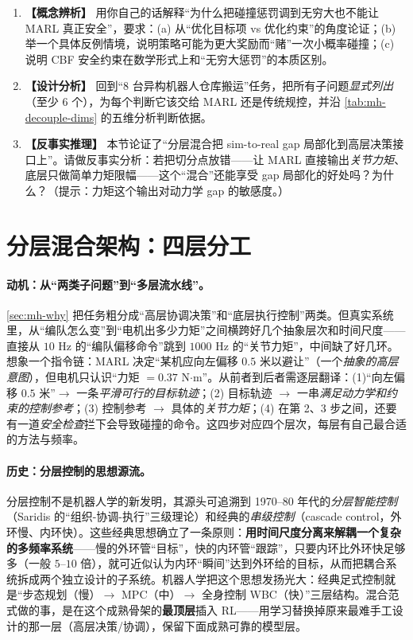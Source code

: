 \begin{practice}
\begin{enumerate}
  \item \textbf{【概念辨析】} 用你自己的话解释“为什么把碰撞惩罚调到无穷大也不能让 MARL 真正安全”，要求：(a) 从“优化目标项 vs 优化约束”的角度论证；(b) 举一个具体反例情境，说明策略可能为更大奖励而“赌”一次小概率碰撞；(c) 说明 CBF 安全约束在数学形式上和“无穷大惩罚”的本质区别。
  \item \textbf{【设计分析】} 回到“$8$ 台异构机器人仓库搬运”任务，把所有子问题\emph{显式列出}（至少 $6$ 个），为每个判断它该交给 MARL 还是传统规控，并沿 \cref{tab:mh-decouple-dims} 的五维分析判断依据。
  \item \textbf{【反事实推理】} 本节论证了“分层混合把 sim-to-real gap 局部化到高层决策接口上”。请做反事实分析：若把切分点放错——让 MARL 直接输出\emph{关节力矩}、底层只做简单力矩限幅——这个“混合”还能享受 gap 局部化的好处吗？为什么？（提示：力矩这个输出对动力学 gap 的敏感度。）
\end{enumerate}
\end{practice}

\section{分层混合架构：四层分工}
\label{sec:mh-hierarchy}

\paragraph{动机：从“两类子问题”到“多层流水线”。}
\cref{sec:mh-why} 把任务粗分成“高层协调决策”和“底层执行控制”两类。但真实系统里，从“编队怎么变”到“电机出多少力矩”之间横跨好几个抽象层次和时间尺度——直接从 $10$ Hz 的“编队偏移命令”跳到 $1000$ Hz 的“关节力矩”，中间缺了好几环。想象一个指令链：MARL 决定“某机应向左偏移 $0.5$ 米以避让”（一个\emph{抽象的高层意图}），但电机只认识“力矩 $=0.37$ N$\cdot$m”。从前者到后者需逐层翻译：(1)“向左偏移 $0.5$ 米”$\to$ 一条\emph{平滑可行的目标轨迹}；(2) 目标轨迹 $\to$ 一串\emph{满足动力学和约束的控制参考}；(3) 控制参考 $\to$ 具体的\emph{关节力矩}；(4) 在第 2、3 步之间，还要有一道\emph{安全检查}拦下会导致碰撞的命令。这四步对应四个层次，每层有自己最合适的方法与频率。

\paragraph{历史：分层控制的思想源流。}
分层控制不是机器人学的新发明，其源头可追溯到 1970--80 年代的\emph{分层智能控制}（Saridis 的“组织-协调-执行”三级理论）和经典的\emph{串级控制}（cascade control，外环慢、内环快）。这些经典思想确立了一条原则：\textbf{用时间尺度分离来解耦一个复杂的多频率系统}——慢的外环管“目标”，快的内环管“跟踪”，只要内环比外环快足够多（一般 $5$--$10$ 倍），就可近似认为内环“瞬间”达到外环给的目标，从而把耦合系统拆成两个独立设计的子系统。机器人学把这个思想发扬光大：经典足式控制就是“步态规划（慢）$\to$ MPC（中）$\to$ 全身控制 WBC（快）”三层结构。混合范式做的事，是在这个成熟骨架的\textbf{最顶层}插入 RL——用学习替换掉原来最难手工设计的那一层（高层决策/协调），保留下面成熟可靠的模型层。

